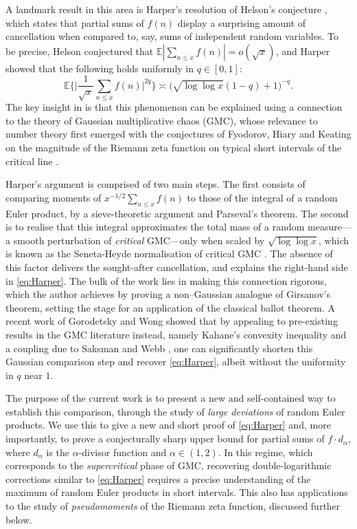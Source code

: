 \documentclass{amsart}
\theoremstyle{definition}
\theoremstyle{remark}
\numberwithin{equation}{section}
\begin{document}
A landmark result in this area is Harper's \cite{HarperRMF} resolution of Helson's conjecture \cite{Helson}, which states that partial sums of $f(n)$ display a surprising amount of cancellation when compared to, say, sums of independent random variables. To be precise, Helson conjectured that $\mathbb{E}|\sum_{n\leq x}f(n)|=o(\sqrt{x})$, and Harper showed that the following holds uniformly in $q\in [0,1]$:
\begin{equation}\label{eq:Harper}
        \mathbb{E}\bigg\{\Big|\frac{1}{\sqrt{x}}\sum_{n\leq x}f(n)\Big|^{2q}\bigg\}\asymp \big(\sqrt{\log\log x}(1-q)+1\big)^{-q}.
\end{equation}
The key insight in \cite{HarperRMF} is that this phenomenon can be explained using a connection to the theory of  Gaussian multiplicative chaos (GMC), whose relevance to number theory first emerged with the conjectures of Fyodorov, Hiary and Keating on the magnitude of the Riemann zeta function on typical short intervals of the critical line \cite{FyodorovHiaryKeating, FyodorovKeating}. 

Harper's argument is comprised of two main steps. The first consists of comparing moments of $x^{-1/2}\sum_{n\leq x}f(n)$ to those of the integral of a random Euler product, by a sieve-theoretic argument and Parseval's theorem. The second is to realise that this integral approximates the total mass of a random measure---a smooth perturbation of  \textit{critical} GMC---only when scaled by $\sqrt{\log\log x}$, which is known as the Seneta-Heyde normalisation of critical GMC \cite{PowellSurvey}. The absence of this factor delivers the sought-after cancellation, and explains the right-hand side in \eqref{eq:Harper}. The bulk of the work lies in making this connection rigorous, which the author achieves by proving a non--Gaussian analogue of Girsanov's theorem, setting the stage for an application of the classical {ballot theorem}. A recent work of Gorodetsky and Wong \cite{GWHelson} showed that by appealing to pre-existing results in the GMC literature instead, namely Kahane's convexity inequality and a coupling due to Saksman and Webb \cite{SaksmanWebb}, one can significantly shorten this Gaussian comparison step and recover \eqref{eq:Harper}, albeit without the uniformity in $q$ near $1$.

The purpose of the current work is to present a new and self-contained way to establish this comparison, through the study of \textit{large deviations} of random Euler products. We use this to give a new and short proof of \eqref{eq:Harper} and, more importantly, to prove a conjecturally sharp upper bound for partial sums of $f\cdot d_\alpha$, where $d_\alpha$ is the $\alpha$-divisor function and $\alpha\in (1,2)$. In this regime, which corresponds to the \textit{supercritical} phase of GMC, recovering double-logarithmic corrections similar to \eqref{eq:Harper} requires a precise understanding of the maximum of random Euler products in short intervals. This also has applications to the study of \textit{pseudomoments} of the Riemann zeta function, discussed further below.
\end{document}
